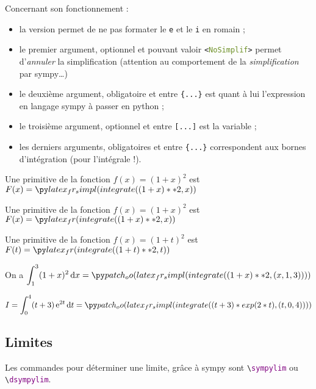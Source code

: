 \documentclass[french,a4paper,11pt]{article}
\newcommand\Cle[1]{{\bfseries\sffamily\textlangle #1\textrangle}}
\begin{document}
\begin{tipblock}
Concernant son fonctionnement :

\begin{itemize}
	\item la version \Cle{*} permet de ne pas formater le \texttt{e} et le \texttt{i} en \textsf{romain} ;
	\item le premier argument, optionnel et pouvant valoir \texttt{<\textcolor{OliveDrab}{NoSimplif}>} permet d'\textit{annuler} la simplification (attention au comportement de la \textit{simplification} par \textsf{sympy}\ldots)
	\item le deuxième argument, obligatoire et entre \texttt{\{...\}} est quant à lui l'expression en langage \textsf{sympy} à passer en \textsf{python} ;
	\item le troisième argument, optionnel et entre \texttt{[...]} est la variable ;
	\item les derniers arguments, obligatoires et entre \texttt{\{...\}} correspondent aux bornes d'intégration (pour l'intégrale !).
\end{itemize}
\vspace*{-\baselineskip}\leavevmode
\end{tipblock}

\begin{bloctext}
Une primitive de la fonction $f(x)=(1+x)^2$ est $F(x) = \dsympyprim{(1+x)**2}$

Une primitive de la fonction $f(x)=(1+x)^2$ est $F(x) = \dsympyprim<NoSimplif>{(1+x)**2}$

Une primitive de la fonction $f(x)=(1+t)^2$ est $F(t) = \dsympyprim<NoSimplif>{(1+t)**2}[t]$
\end{bloctext}

\begin{bloctext}
On a $\displaystyle\int_1^3 (1+x)^2\,\text{d}x = \dsympyintegr{(1+x)**2}{1}{3}$

$I=\displaystyle\int_0^{4} (t+3)\,\e^{2t}\,\text{d}t = \dsympyintegr{(t+3)*exp(2*t)}[t]{0}{4}$
\end{bloctext}

\subsection{Limites}

\begin{cautionblock}
Les commandes pour déterminer une limite, grâce à \textsf{sympy} sont \texttt{\textbackslash \textcolor{purple}{sympylim}} ou \texttt{\textbackslash \textcolor{purple}{dsympylim}}.

\end{cautionblock}
\end{document}
